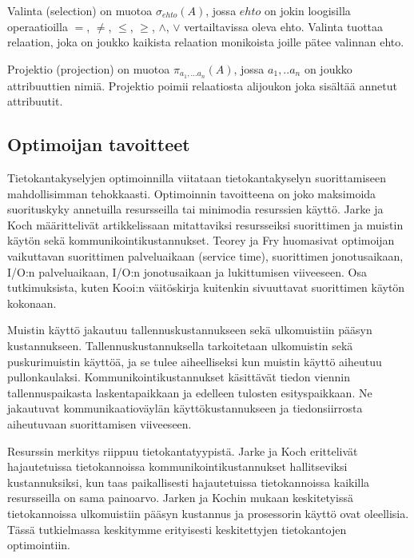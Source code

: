 \documentclass[finnish]{tktltiki2}
\theoremstyle{definition}
\theoremstyle{remark}
\begin{document}
Valinta (selection) on muotoa $\sigma_{ehto}(A)$, jossa $ehto$ on jokin loogisilla operaatioilla $=$, $\neq$, $\leq$, $\geq$, $\wedge$, $\vee$ vertailtavissa oleva ehto. Valinta tuottaa relaation, joka on joukko kaikista relaation monikoista joille pätee valinnan ehto.	

Projektio (projection) on muotoa $\pi_{a_1,...a_n}(A)$, jossa $a_1,..a_n$ on joukko attribuuttien nimiä. Projektio poimii relaatiosta alijoukon joka sisältää annetut attribuutit.


\subsection{Optimoijan tavoitteet}
Tietokantakyselyjen optimoinnilla viitataan tietokantakyselyn suorittamiseen mahdollisimman tehokkaasti. Optimoinnin tavoitteena on joko maksimoida suorituskyky annetuilla resursseilla tai minimodia resurssien käyttö. Jarke ja Koch määrittelivät artikkelissaan \cite{jarke1984} mitattaviksi resursseiksi suorittimen ja muistin käytön sekä kommunikointikustannukset. Teorey ja Fry \cite{teorey1982design} huomasivat optimoijan vaikuttavan suorittimen palveluaikaan (service time), suorittimen jonotusaikaan, I/O:n palveluaikaan, I/O:n jonotusaikaan ja lukittumisen viiveeseen. Osa tutkimuksista, kuten Kooi:n väitöskirja \cite{kooi1980optimization} kuitenkin sivuuttavat suorittimen käytön kokonaan.

Muistin käyttö jakautuu tallennuskustannukseen sekä ulkomuistiin pääsyn kustannukseen. Tallennuskustannuksella tarkoitetaan ulkomuistin sekä puskurimuistin käyttöä, ja se tulee aiheelliseksi kun muistin käyttö aiheutuu pullonkaulaksi. Kommunikointikustannukset käsittävät tiedon viennin tallennuspaikasta laskentapaikkaan ja edelleen tulosten esityspaikkaan. Ne jakautuvat kommunikaatioväylän käyttökustannukseen ja tiedonsiirrosta aiheutuvaan suorittamisen viiveeseen.

Resurssin merkitys riippuu tietokantatyypistä. Jarke ja Koch erittelivät hajautetuissa tietokannoissa kommunikointikustannukset hallitseviksi kustannuksiksi, kun taas paikallisesti hajautetuissa tietokannoissa kaikilla resursseilla on sama painoarvo. Jarken ja Kochin mukaan keskitetyissä tietokannoissa ulkomuistiin pääsyn kustannus ja prosessorin käyttö ovat oleellisia. Tässä tutkielmassa keskitymme erityisesti keskitettyjen tietokantojen optimointiin.
\end{document}
